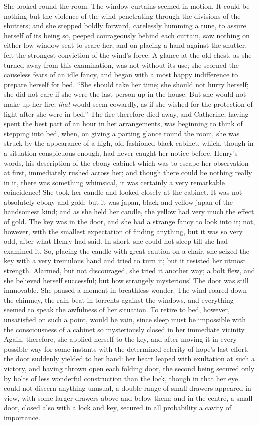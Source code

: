 She looked round the room. The window curtains seemed in motion. It could be nothing but the violence of the wind penetrating through the divisions of the shutters; and she stepped boldly forward, carelessly humming a tune, to assure herself of its being so, peeped courageously behind each curtain, saw nothing on either low window seat to scare her, and on placing a hand against the shutter, felt the strongest conviction of the wind's force. A glance at the old chest, as she turned away from this examination, was not without its use; she scorned the causeless fears of an idle fancy, and began with a most happy indifference to prepare herself for bed. “She should take her time; she should not hurry herself; she did not care if she were the last person up in the house. But she would not make up her fire; {\em that} would seem cowardly, as if she wished for the protection of light after she were in bed.” The fire therefore died away, and Catherine, having spent the best part of an hour in her arrangements, was beginning to think of stepping into bed, when, on giving a parting glance round the room, she was struck by the appearance of a high, old-fashioned black cabinet, which, though in a situation conspicuous enough, had never caught her notice before. Henry's words, his description of the ebony cabinet which was to escape her observation at first, immediately rushed across her; and though there could be nothing really in it, there was something whimsical, it was certainly a very remarkable coincidence! She took her candle and looked closely at the cabinet. It was not absolutely ebony and gold; but it was japan, black and yellow japan of the handsomest kind; and as she held her candle, the yellow had very much the effect of gold. The key was in the door, and she had a strange fancy to look into it; not, however, with the smallest expectation of finding anything, but it was so very odd, after what Henry had said. In short, she could not sleep till she had examined it. So, placing the candle with great caution on a chair, she seized the key with a very tremulous hand and tried to turn it; but it resisted her utmost strength. Alarmed, but not discouraged, she tried it another way; a bolt flew, and she believed herself successful; but how strangely mysterious! The door was still immovable. She paused a moment in breathless wonder. The wind roared down the chimney, the rain beat in torrents against the windows, and everything seemed to speak the awfulness of her situation. To retire to bed, however, unsatisfied on such a point, would be vain, since sleep must be impossible with the consciousness of a cabinet so mysteriously closed in her immediate vicinity. Again, therefore, she applied herself to the key, and after moving it in every possible way for some instants with the determined celerity of hope's last effort, the door suddenly yielded to her hand: her heart leaped with exultation at such a victory, and having thrown open each folding door, the second being secured only by bolts of less wonderful construction than the lock, though in that her eye could not discern anything unusual, a double range of small drawers appeared in view, with some larger drawers above and below them; and in the centre, a small door, closed also with a lock and key, secured in all probability a cavity of importance.

